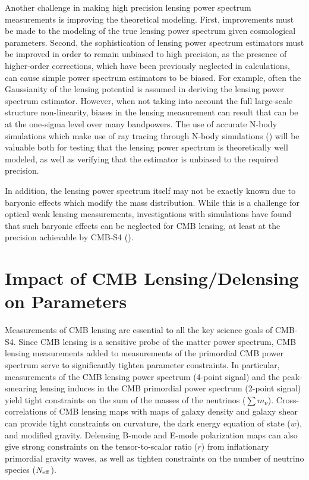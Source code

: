 Another challenge in making high precision lensing power spectrum measurements is improving the theoretical modeling. First, improvements must be made to the modeling of the true lensing power spectrum given cosmological parameters. Second, the sophistication of lensing power spectrum estimators must be improved in order to remain unbiased to high precision, as the presence of higher-order corrections, which have been previously neglected in calculations, can cause simple power spectrum estimators to be biased. For example, often the Gaussianity of the lensing potential is assumed in deriving the lensing power spectrum estimator.  However, when not taking into account the full large-scale structure non-linearity, biases in the lensing measurement can result that can be at the one-sigma level over many bandpowers.  The use of accurate N-body simulations which make use of ray tracing through N-body simulations (\cite{Calabrese:2014gla}) will be valuable both for testing that the lensing power spectrum is theoretically well modeled, as well as verifying that the estimator is unbiased to the required precision.

In addition, the lensing power spectrum itself may not be exactly known due to baryonic effects which modify the mass distribution. While this is a challenge for optical weak lensing measurements, investigations with simulations have found that such baryonic effects can be neglected for CMB lensing, at least at the precision achievable by CMB-S4 (\cite{Natarajan:2014xba}).

\section{Impact of CMB Lensing/Delensing on Parameters}\label{forecasts}

Measurements of CMB lensing are essential to all the key science goals of CMB-S4.  Since CMB lensing is a sensitive probe of the matter power spectrum, CMB lensing measurements added to measurements of the primordial CMB power spectrum serve to significantly tighten parameter constraints.  In particular, measurements of the CMB lensing power spectrum (4-point signal) and the peak-smearing lensing induces in the CMB primordial power spectrum (2-point signal) yield tight constraints on the sum of the masses of the neutrinos ($\sum {m_\nu}$).  Cross-correlations of CMB lensing maps with maps of galaxy density and galaxy shear can provide tight constraints on curvature, the dark energy equation of state ($w$), and modified gravity.  Delensing B-mode and E-mode polarization maps can also give strong constraints on the tensor-to-scalar ratio ($r$) from inflationary primordial gravity waves, as well as tighten constraints on the number of neutrino species ($N_{\rm{eff}}$).  

